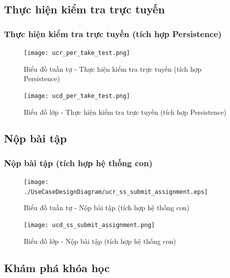 \documentclass[./../main.tex]{subfiles}
\begin{document}
\subsection{Thực hiện kiểm tra trực tuyến}
\subsubsection{Thực hiện kiểm tra trực tuyến (tích hợp Persistence)}
\begin{figure}[H]
    \centering
    \texttt{[image: ucr\_per\_take\_test.png]}
    \caption{Biểu đồ tuần tự - Thực hiện kiểm tra trực tuyến (tích hợp Persistence)}
\end{figure}
\begin{figure}[H]
    \centering
    \texttt{[image: ucd\_per\_take\_test.png]}
    \caption{Biểu đồ lớp - Thực hiện kiểm tra trực tuyến (tích hợp Persistence)}
\end{figure}

\subsection{Nộp bài tập}
\subsubsection{Nộp bài tập (tích hợp hệ thống con)}
\begin{figure}[H]
    \centering
    \texttt{[image: ./UseCaseDesignDiagram/ucr\_ss\_submit\_assignment.eps]}
    \caption{Biểu đồ tuần tự - Nộp bài tập (tích hợp hệ thống con)}
\end{figure}
\begin{figure}[H]
    \centering
    \texttt{[image: ucd\_ss\_submit\_assignment.png]}
    \caption{Biểu đồ lớp - Nộp bài tập (tích hợp hệ thống con)}
\end{figure}

\subsection{Khám phá khóa học}
\end{document}
